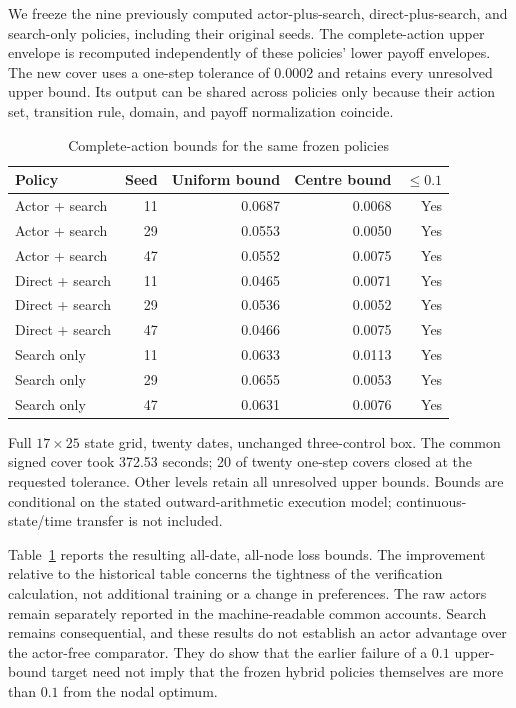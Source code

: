 We freeze the nine previously computed actor-plus-search, direct-plus-search, and search-only policies, including their original seeds. The complete-action upper envelope is recomputed independently of these policies' lower payoff envelopes. The new cover uses a one-step tolerance of $0.0002$ and retains every unresolved upper bound. Its output can be shared across policies only because their action set, transition rule, domain, and payoff normalization coincide.

\begin{table}[htbp]
\centering\small\setlength{\tabcolsep}{4pt}
\caption{Complete-action bounds for the same frozen policies}\label{tab:r9common}
\begin{tabular}{lrrrr}
\toprule
Policy & Seed & Uniform bound & Centre bound & $\leq0.1$ \\
\midrule
Actor + search & 11 & 0.0687 & 0.0068 & Yes \\
Actor + search & 29 & 0.0553 & 0.0050 & Yes \\
Actor + search & 47 & 0.0552 & 0.0075 & Yes \\
Direct + search & 11 & 0.0465 & 0.0071 & Yes \\
Direct + search & 29 & 0.0536 & 0.0052 & Yes \\
Direct + search & 47 & 0.0466 & 0.0075 & Yes \\
Search only & 11 & 0.0633 & 0.0113 & Yes \\
Search only & 29 & 0.0655 & 0.0053 & Yes \\
Search only & 47 & 0.0631 & 0.0076 & Yes \\
\bottomrule
\end{tabular}
\par\vspace{3pt}\begin{minipage}{0.97\linewidth}\footnotesize Full $17\times25$ state grid, twenty dates, unchanged three-control box. The common signed cover took 372.53 seconds; 20 of twenty one-step covers closed at the requested tolerance. Other levels retain all unresolved upper bounds. Bounds are conditional on the stated outward-arithmetic execution model; continuous-state/time transfer is not included.\end{minipage}
\end{table}


Table~\ref{tab:r9common} reports the resulting all-date, all-node loss bounds. The improvement relative to the historical table concerns the tightness of the verification calculation, not additional training or a change in preferences. The raw actors remain separately reported in the machine-readable common accounts. Search remains consequential, and these results do not establish an actor advantage over the actor-free comparator. They do show that the earlier failure of a $0.1$ upper-bound target need not imply that the frozen hybrid policies themselves are more than $0.1$ from the nodal optimum.

